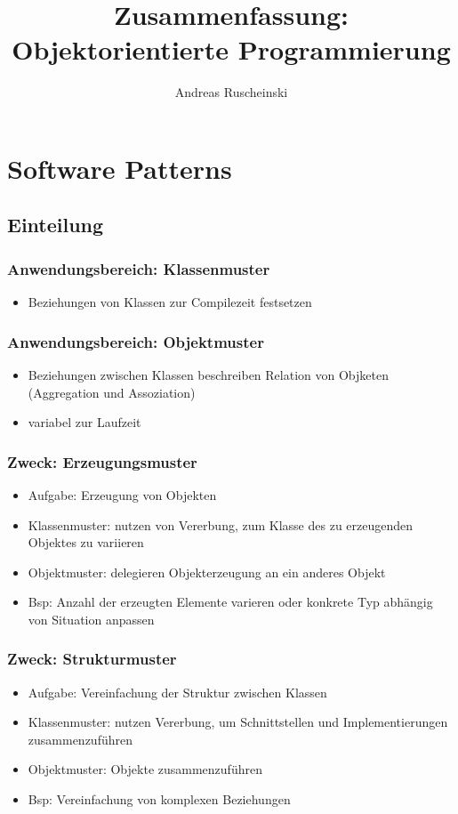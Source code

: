 \documentclass[11pt, fleqn, a4paper, leqno]{scrartcl} %
\title{Zusammenfassung: Objektorientierte Programmierung}
\author{Andreas Ruscheinski}
\begin{document}
\maketitle
\section{Software Patterns}
	\subsection{Einteilung}
		\subsubsection{Anwendungsbereich: Klassenmuster}
			\begin{itemize}
				\item Beziehungen von Klassen zur Compilezeit festsetzen
			\end{itemize}
		\subsubsection{Anwendungsbereich: Objektmuster}
			\begin{itemize}
				\item Beziehungen zwischen Klassen beschreiben Relation von Objketen (Aggregation und Assoziation)
				\item variabel zur Laufzeit
			\end{itemize}
		\subsubsection{Zweck: Erzeugungsmuster}
			\begin{itemize}
				\item Aufgabe: Erzeugung von Objekten
				\item Klassenmuster: nutzen von Vererbung, zum Klasse des zu erzeugenden Objektes zu variieren
				\item Objektmuster: delegieren Objekterzeugung an ein anderes Objekt
				\item Bsp: Anzahl der erzeugten Elemente varieren oder konkrete Typ abhängig von Situation anpassen		
			\end{itemize}
		\subsubsection{Zweck: Strukturmuster}
			\begin{itemize}
				\item Aufgabe: Vereinfachung der Struktur zwischen Klassen
				\item Klassenmuster: nutzen Vererbung, um Schnittstellen und Implementierungen zusammenzuführen
				\item Objektmuster: Objekte zusammenzuführen
				\item Bsp: Vereinfachung von komplexen Beziehungen		
			\end{itemize}
\end{document}

